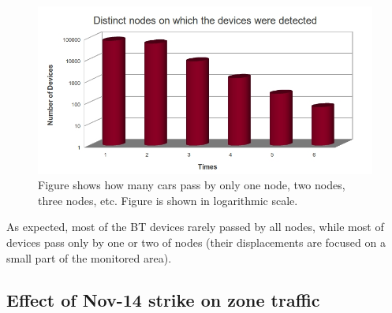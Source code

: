 \documentclass[preprint,authoryear,12pt]{elsarticle}
\begin{document}
 \begin{figure}[htb]
 \begin{center}
 \includegraphics[scale=0.4]{NodosPorDondePasan.jpg}
 \caption{Figure shows how many cars pass by only one node, two nodes, three nodes, etc. Figure is shown in logarithmic scale.
 \label{fNodosPorDondePasan}}
 \end{center}
 \end{figure}

As expected, most of the BT devices rarely passed by all nodes, while most of devices pass only by one or two of nodes (their displacements are focused on a small part of the monitored area).


\subsection{Effect of Nov-14 strike on zone traffic}


\end{document}
